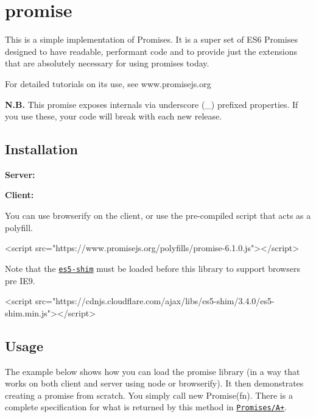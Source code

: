\href{https://promisesaplus.com/}{\tt } \section*{promise}

This is a simple implementation of Promises. It is a super set of E\+S6 Promises designed to have readable, performant code and to provide just the extensions that are absolutely necessary for using promises today.

For detailed tutorials on its use, see www.\+promisejs.\+org

{\bfseries N.\+B.} This promise exposes internals via underscore ({\ttfamily \+\_\+}) prefixed properties. If you use these, your code will break with each new release.

\href{https://travis-ci.org/then/promise}{\tt } \href{https://gemnasium.com/then/promise}{\tt } \href{https://npmjs.org/package/promise}{\tt } \href{https://npmjs.org/package/promise}{\tt }

\subsection*{Installation}

{\bfseries Server\+:} 


{\bfseries Client\+:}

You can use browserify on the client, or use the pre-\/compiled script that acts as a polyfill.


\begin{DoxyCode}
<script src="https://www.promisejs.org/polyfills/promise-6.1.0.js"></script>
\end{DoxyCode}


Note that the \href{https://github.com/es-shims/es5-shim}{\tt es5-\/shim} must be loaded before this library to support browsers pre I\+E9.


\begin{DoxyCode}
<script src="https://cdnjs.cloudflare.com/ajax/libs/es5-shim/3.4.0/es5-shim.min.js"></script>
\end{DoxyCode}


\subsection*{Usage}

The example below shows how you can load the promise library (in a way that works on both client and server using node or browserify). It then demonstrates creating a promise from scratch. You simply call {\ttfamily new Promise(fn)}. There is a complete specification for what is returned by this method in \href{http://promises-aplus.github.com/promises-spec/}{\tt Promises/\+A+}.


